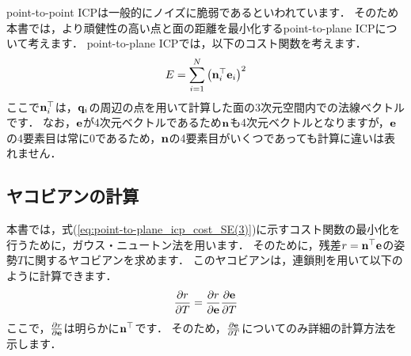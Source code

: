 point-to-point ICPは一般的にノイズに脆弱であるといわれています．
そのため本書では，より頑健性の高い点と面の距離を最小化するpoint-to-plane ICPについて考えます．
point-to-plane ICPでは，以下のコスト関数を考えます．
%
\begin{align}
  E = \sum_{i=1}^{N} \left( {\bf n}_{i}^{\top} {\bf e}_{i} \right)^{2}
  \label{eq:point-to-plane_icp_cost_SE(3)}
\end{align}
%
ここで${\bf n}_{i}^{\top}$は，${\bf q}_{i}$の周辺の点を用いて計算した面の3次元空間内での法線ベクトルです．
なお，${\bf e}$が4次元ベクトルであるため${\bf n}$も4次元ベクトルとなりますが，${\bf e}$の4要素目は常に0であるため，${\bf n}$の4要素目がいくつであっても計算に違いは表れません．





\subsection{ヤコビアンの計算}

本書では，式(\ref{eq:point-to-plane_icp_cost_SE(3)})に示すコスト関数の最小化を行うために，ガウス・ニュートン法を用います．
そのために，残差$r = {\bf n}^{\top} {\bf e}$の姿勢$T$に関するヤコビアンを求めます．
このヤコビアンは，連鎖則を用いて以下のように計算できます．
%
\begin{align}
  \frac{ \partial r }{ \partial T } = \frac{ \partial r }{ \partial {\bf e} }
                                      \frac{ \partial {\bf e} }{ \partial T }
\end{align}
%
ここで，$\frac{ \partial r }{ \partial {\bf e} }$は明らかに${\bf n}^{\top}$です．
そのため，$\frac{ \partial {\bf e} }{ \partial T }$についてのみ詳細の計算方法を示します．

